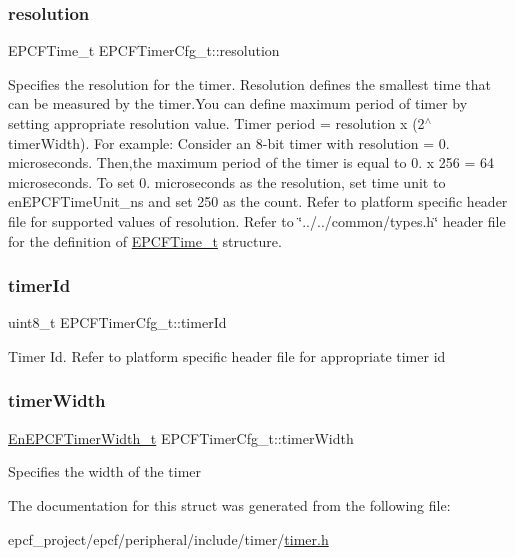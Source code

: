 \subsubsection{\texorpdfstring{resolution}{resolution}}
{\footnotesize\ttfamily E\+P\+C\+F\+Time\+\_\+t E\+P\+C\+F\+Timer\+Cfg\+\_\+t\+::resolution}

Specifies the resolution for the timer. Resolution defines the smallest time that can be measured by the timer.\+You can define maximum period of timer by setting appropriate resolution value. Timer period = resolution x (2$^\wedge$timer\+Width). For example\+: Consider an 8-\/bit timer with resolution = 0. microseconds. Then,the maximum period of the timer is equal to 0. x 256 = 64 microseconds. To set 0. microseconds as the resolution, set time unit to en\+E\+P\+C\+F\+Time\+Unit\+\_\+ns and set 250 as the count. Refer to platform specific header file for supported values of resolution. Refer to \char`\"{}../../common/types.\+h\char`\"{} header file for the definition of \mbox{\hyperlink{}{E\+P\+C\+F\+Time\+\_\+t}} structure. \mbox{\label{structEPCFTimerCfg__t_a3d76ca6bd21e3c79c1108bfd5ca12203}} 
\subsubsection{\texorpdfstring{timer\+Id}{timerId}}
{\footnotesize\ttfamily uint8\+\_\+t E\+P\+C\+F\+Timer\+Cfg\+\_\+t\+::timer\+Id}

Timer Id. Refer to platform specific header file for appropriate timer id \mbox{\label{structEPCFTimerCfg__t_a4e6c52d71b02feed17bf2a82f52e0dd5}} 
\subsubsection{\texorpdfstring{timer\+Width}{timerWidth}}
{\footnotesize\ttfamily \mbox{\hyperlink{timer_8h_a88093e16b89eaa9d2df5fc6285cffa9f}{En\+E\+P\+C\+F\+Timer\+Width\+\_\+t}} E\+P\+C\+F\+Timer\+Cfg\+\_\+t\+::timer\+Width}

Specifies the width of the timer 

The documentation for this struct was generated from the following file\+:\begin{DoxyCompactItemize}
\item 
epcf\+\_\+project/epcf/peripheral/include/timer/\mbox{\hyperlink{timer_8h}{timer.\+h}}\end{DoxyCompactItemize}
